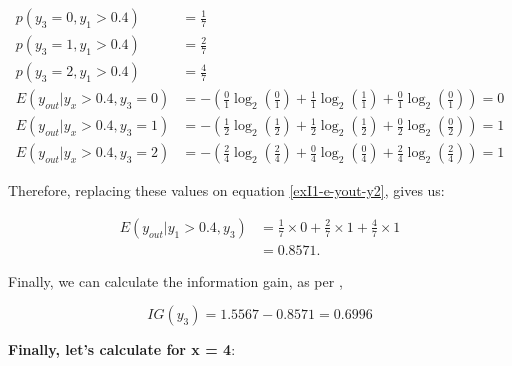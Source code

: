 \documentclass[12pt]{article}
\begin{document}
\begin{enumerate}[leftmargin=\labelsep]
    \[
        \begin{aligned}
            p(y_3 = 0, y_1 > 0.4)          & = \frac{1}{7}                                                                                    \\
            p(y_3 = 1, y_1 > 0.4)          & = \frac{2}{7}                                                                                    \\
            p(y_3 = 2, y_1 > 0.4)          & = \frac{4}{7}                                                                                    \\
            E(y_{out} | y_x > 0.4 , y_3 = 0) & = - \left(\frac{0}{1} \log_2\left(\frac{0}{1}\right) + \frac{1}{1} \log_2\left(\frac{1}{1}\right)
                + \frac{0}{1} \log_2\left(\frac{0}{1}\right)\right) = 0                                                                       \\
            E(y_{out} | y_x > 0.4 , y_3 = 1) & = - \left(\frac{1}{2} \log_2\left(\frac{1}{2}\right) + \frac{1}{2} \log_2\left(\frac{1}{2}\right)
                + \frac{0}{2} \log_2\left(\frac{0}{2}\right)\right) = 1                                                                       \\
            E(y_{out} | y_x > 0.4 , y_3 = 2) & = - \left(\frac{2}{4} \log_2\left(\frac{2}{4}\right) + \frac{0}{4} \log_2\left(\frac{0}{4}\right)
                + \frac{2}{4} \log_2\left(\frac{2}{4}\right)\right) = 1
        \end{aligned}
    \]

    Therefore, replacing these values on equation \eqref{exI1-e-yout-y2}, gives us:

    \[
        \begin{aligned}
            E(y_{out} | y_1>0.4, y_3) & = \frac{1}{7} \times 0 + \frac{2}{7} \times 1 +  \frac{4}{7} \times 1                                \\
                             & = 0.8571.
        \end{aligned}
    \]

    Finally, we can calculate the information gain, as per \label{ex4-sp},

    \[
        IG(y_{3}) = 1.5567 - 0.8571 = 0.6996
    \]

    \textbf{Finally, let's calculate for x = 4}:


\end{enumerate}
\end{document}
